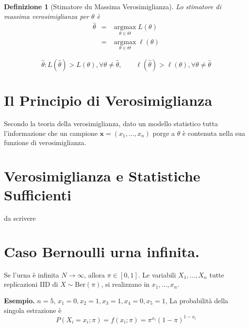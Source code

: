 \documentclass[
  11pt,
]{book}
\theoremstyle{mytheoremstyle}
\theoremstyle{mydefstyle}
\newtheorem{definition}{Definizione}[section]
\begin{document}
\begin{info}

\begin{definition}[Stimatore du Massima Verosimiglianza]
Lo stimatore di \emph{massima verosimiglianza} per \(\theta\) è
\begin{eqnarray*}
\hat\theta &=& \operatorname*{\text{argmax}}_{\theta\in\Theta} L(\theta)\\
           &=& \operatorname*{\text{argmax}}_{\theta\in\Theta} \ell(\theta)
\end{eqnarray*}

\[\hat\theta:L(\hat\theta)>L(\theta), \forall\theta\neq\hat\theta, \qquad\ell(\hat\theta)>\ell(\theta), \forall\theta\neq\hat\theta\]
\end{definition}

\end{info}

\section{Il Principio di Verosimiglianza}\label{il-principio-di-verosimiglianza}

Secondo la teoria della verosimiglianza, dato un modello statistico
tutta l'informazione che un campione
\(\mathbf{x}=(x_1,...,x_n)\) porge a \(\theta\) è contenuta nella sua funzione di
verosimiglianza.

\section{Verosimiglianza e Statistiche Sufficienti}\label{verosimiglianza-e-statistiche-sufficienti}

da scrivere

\section{Caso Bernoulli urna infinita.}\label{caso-bernoulli-urna-infinita.}

Se l'urna è infinita \(N\to\infty\), allora \(\pi\in[0,1]\).
Le variabili \(X_1,...,X_n\) tutte replicazioni IID di \(X\sim \text{Ber}(\pi)\), si realizzano in \(x_1,...,x_n\).

\textbf{Esempio.} \(n=5\), \(x_1=0,x_2=1,x_3=1,x_4=0,x_5=1\),
La probabilità della singola estrazione è
\[P(X_i=x_i;\pi)=f(x_i;\pi)=\pi^{x_i}(1-\pi)^{1-x_i}\]
\end{document}
